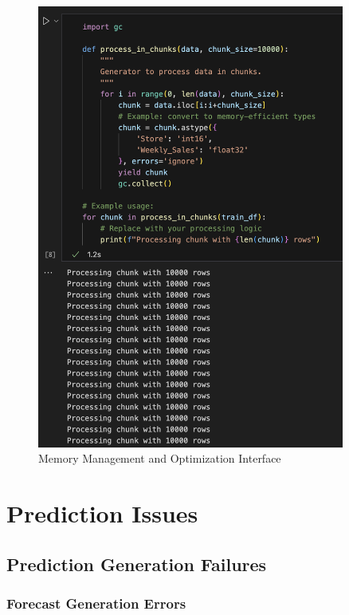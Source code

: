 \begin{figure}[H]
	\centering
	\includegraphics[width=0.9\textwidth]{Images/08Troubleshooting/MemoryManagement.png}
	\caption{Memory Management and Optimization Interface}
	\label{fig:memory_management}
\end{figure}

\section{Prediction Issues}

\subsection{Prediction Generation Failures}

\subsubsection{Forecast Generation Errors}

